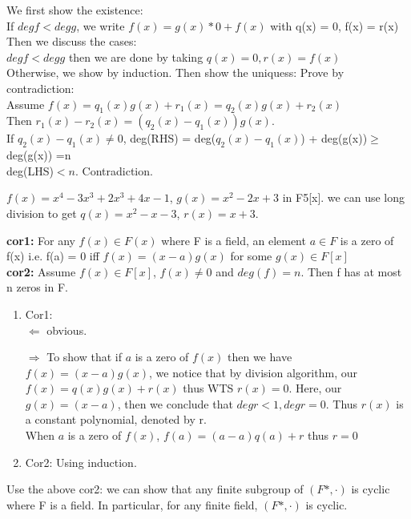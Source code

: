 \documentclass{article}
\begin{document}
\begin{Proof}
    We first show the existence:
    \\ If $deg f < deg g$, we write $f(x) = g(x)* 0 + f(x)$ with q(x) = 0, f(x) = r(x)
    Then we discuss the cases: 
    \\$deg f< deg g$ then we are done by taking $q(x) = 0, r(x) = f(x)$
    \\ Otherwise, we show by induction.
Then show the uniquess: 
Prove by contradiction:
\\ Assume $f(x) = q_1(x)g(x) + r_1(x) = q_2(x)g(x)+r_2(x)$ 
\\Then $r_1(x) - r_2(x) = (q_2(x)-q_1(x))g(x)$.
\\If $q_2(x)-q_1(x)\neq 0$, deg(RHS) = deg($q_2(x)-q_1(x)$) + deg(g(x))$\geq $ deg(g(x)) =n
\\deg(LHS)$ < n.$
Contradiction. 
\end{Proof}
\begin{Example}
    $f(x) = x^4 - 3x^3 + 2x^3+4x -1$, $g(x) = x^2 - 2x + 3$ in F5[x].
    we can use long division to get $q(x) = x^2 - x-3$, $r(x) = x + 3$.
\end{Example}
\begin{theorem}
    \textbf{cor1:} For any $f(x) \in F(x)$ where F is a field, an element $a \in F$ is a zero of f(x) i.e. f(a) = 0 iff $f(x) = (x-a)g(x)$ for some $g(x) \in F[x]$
    \\\textbf{cor2:} Assume $f(x) \in F[x]$, $f(x) \neq 0$ and $deg(f) = n$. Then f has at most n zeros in F.
\end{theorem}

\begin{Proof}
    \begin{enumerate}
        \item Cor1:
        \\$\Leftarrow$ obvious.

$\Rightarrow$ To show that if $a$ is a zero of $f(x)$ then we have $f(x) = (x-a)g(x)$, we notice that by division algorithm, our $f(x) = q(x)g(x) + r(x)$ thus WTS $r(x) = 0$. Here, our $g(x) = (x-a)$, then we conclude that $deg r < 1, deg r = 0$. Thus $r(x)$ is a constant polynomial, denoted by r. 
\\ When $a$ is a zero of $f(x)$, $f(a) = (a-a)q(a) + r$ thus $r = 0$
        \item Cor2: Using induction.
    \end{enumerate}
\end{Proof}
\begin{Example}
    Use the above cor2: we can show that any finite subgroup of $(F*, \cdot)$ is cyclic where F is a field. In particular, for any finite field, $(F*, \cdot)$ is cyclic. 
\end{Example}
\end{document}
